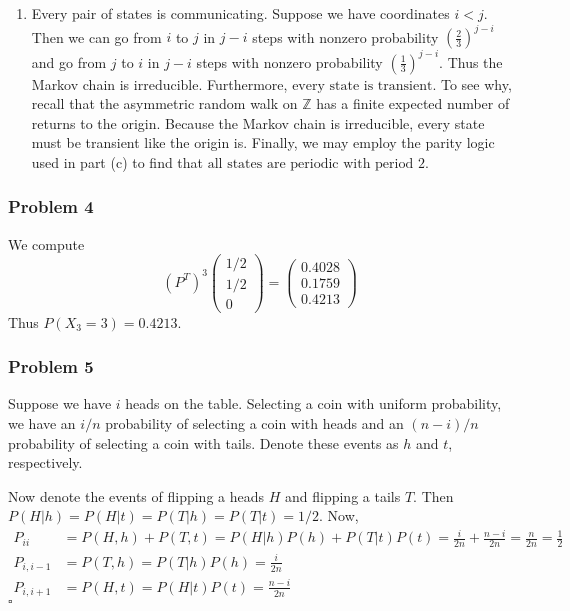 \documentclass[letterpaper,12pt]{article}
\renewcommand*{\qed}{\hfill\ensuremath{\square}}
\begin{document}
\begin{flushleft}
\begin{enumerate}[label=(\alph*)]
        \item
        Every pair of states is communicating. Suppose we have coordinates $i < j$. Then we can go from $i$ to $j$ in $j - i$ steps with nonzero probability $\left(\frac{2}{3}\right)^{j - i}$ and go from $j$ to $i$ in $j - i$ steps with nonzero probability $\left(\frac{1}{3}\right)^{j - i}$. Thus the Markov chain is $\boxed{\text{irreducible}}$. Furthermore, $\boxed{\text{every state is transient}}$. To see why, recall that the asymmetric random walk on $\mathbb{Z}$ has a finite expected number of returns to the origin. Because the Markov chain is irreducible, every state must be transient like the origin is. Finally, we may employ the parity logic used in part (c) to find that $\boxed{\text{all states are periodic with period 2}}$.

    \end{enumerate}

    \subsubsection*{Problem 4}
    We compute
    $$(P^T)^3 \begin{pmatrix} 1/2 \\ 1/2 \\ 0 \end{pmatrix} = \begin{pmatrix} 0.4028 \\ 0.1759 \\ 0.4213 \end{pmatrix}$$
    Thus $\boxed{P(X_3 = 3) = 0.4213}$.

    \subsubsection*{Problem 5}
    Suppose we have $i$ heads on the table. Selecting a coin with uniform probability, we have an $i/n$ probability of selecting a coin with heads and an $(n-i)/n$ probability of selecting a coin with tails. Denote these events as $h$ and $t$, respectively.

    Now denote the events of flipping a heads $H$ and flipping a tails $T$. Then $P(H | h) = P(H | t) = P(T | h) = P(T | t) = 1/2$. Now,
    \begin{align*}
        P_{ii} &= P(H, h) + P(T, t) = P(H | h)P(h) + P(T | t)P(t) = \frac{i}{2n} + \frac{n - i}{2n} = \frac{n}{2n} = \frac{1}{2} \\
        P_{i,i-1} &= P(T, h) = P(T | h)P(h) = \frac{i}{2n} \\
        P_{i,i+1} &= P(H, t) = P(H | t)P(t) = \frac{n - i}{2n}
    \end{align*}
    \qed

\end{flushleft}
\end{document}
